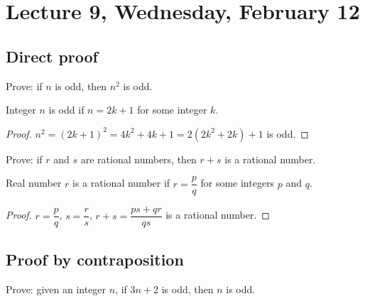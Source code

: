 \section{Lecture 9, Wednesday, February 12}

\subsection{Direct proof}

\begin{ex}

Prove: if $n$ is odd, then $n^2$ is odd.

\end{ex}

\begin{defn}

Integer $n$ is odd if $n = 2k + 1$ for some integer $k$.

\end{defn}

\begin{proof}

$n^2 = (2k + 1)^2 = 4k^2 + 4k + 1 = 2(2k^2 + 2k) + 1$ is odd.

\end{proof}

\begin{ex}

Prove: if $r$ and $s$ are rational numbers, then $r + s$ is a rational number.

\end{ex}

\begin{defn}

Real number $r$ is a rational number if $r = \dfrac{p}{q}$ for some integers $p$ and $q$.

\end{defn}

\begin{proof}

$r = \dfrac{p}{q}$, $s = \dfrac{r}{s}$, $r + s = \dfrac{ps + qr}{qs}$ is a rational number.

\end{proof}

\subsection{Proof by contraposition}

\begin{ex}

Prove: given an integer $n$, if $3n + 2$ is odd, then $n$ is odd.

\end{ex}

